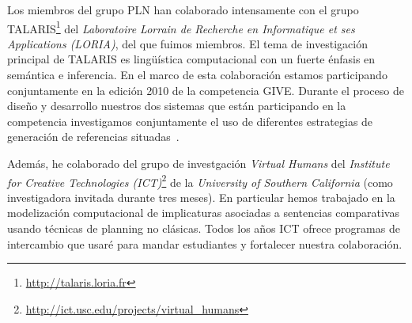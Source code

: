 \documentclass[11pt]{article}
\begin{document}
Los miembros del grupo PLN han colaborado intensamente con el grupo
TALARIS\footnote{\url{http://talaris.loria.fr}}
del \emph{Laboratoire Lorrain de Recherche en Informatique et ses
Applications (LORIA)}, del que fuimos miembros. El tema de investigaci\'on
principal de TALARIS es ling\"u\'istica computacional con un fuerte \'enfasis
en sem\'antica e inferencia. En el marco de esta colaboraci\'on estamos
participando conjuntamente en la edici\'on 2010 de la competencia GIVE. Durante
el proceso de dise\~no y desarrollo nuestros dos sistemas que est\'an
participando en la competencia investigamos conjuntamente el uso de diferentes
estrategias de generaci\'on de referencias situadas~\citep{amoia10}. 

Adem\'as, he colaborado del grupo de investgaci\'on \emph{Virtual Humans} del
\emph{Institute for Creative
Technologies (ICT)}\footnote{\url{http://ict.usc.edu/projects/virtual_humans}}
de la \emph{University of Southern California} (como investigadora invitada
durante tres meses). En particular hemos trabajado en la modelizaci\'on
computacional de implicaturas asociadas a sentencias comparativas usando
t\'ecnicas de planning no cl\'asicas. Todos los a\~nos ICT ofrece programas de
intercambio que usar\'e para mandar estudiantes y fortalecer nuestra
colaboraci\'on. 


\end{document}

